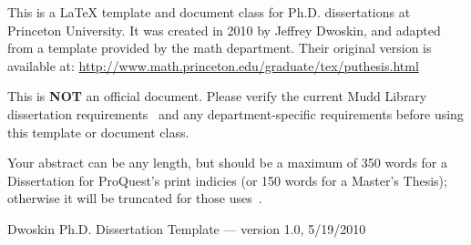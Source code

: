 This is a \LaTeX{} template and document class for Ph.D. dissertations at Princeton University. It was created in 2010 by Jeffrey Dwoskin, and adapted from a template provided by the math department. Their original version is available at: \url{http://www.math.princeton.edu/graduate/tex/puthesis.html}

This is \textbf{NOT} an official document. Please verify the current Mudd Library dissertation requirements~\cite{mudd2009} and any department-specific requirements before using this template or document class.


Your abstract can be any length, but should be a maximum of 350 words for a Dissertation for ProQuest's print indicies (or 150 words for a Master's Thesis); otherwise it will be truncated for those uses~\cite{proquest2006}.


Dwoskin Ph.D. Dissertation Template --- version 1.0, 5/19/2010